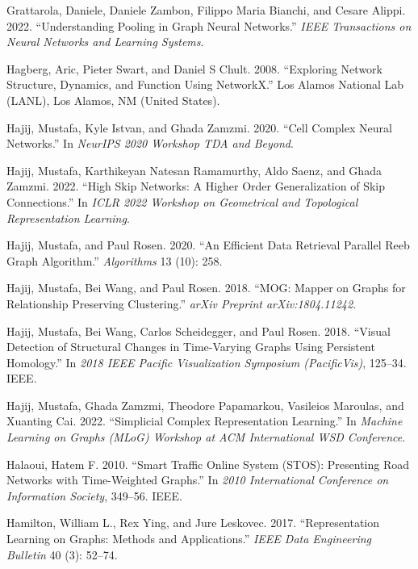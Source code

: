 \documentclass[
  12pt,
]{krantz}
\newlength{\cslhangindent}
\newenvironment{CSLReferences}[2] %
 {\begin{list}{}{%
  \setlength{\itemindent}{0pt}
  \setlength{\leftmargin}{0pt}
  \setlength{\parsep}{0pt}
  \ifodd #1
   \setlength{\leftmargin}{\cslhangindent}
   \setlength{\itemindent}{-1\cslhangindent}
  \fi
  \setlength{\itemsep}{#2\baselineskip}}}
 {\end{list}}
\begin{document}
\begin{CSLReferences}{1}{0}
Grattarola, Daniele, Daniele Zambon, Filippo Maria Bianchi, and Cesare
Alippi. 2022. {``Understanding Pooling in Graph Neural Networks.''}
\emph{IEEE Transactions on Neural Networks and Learning Systems}.

Hagberg, Aric, Pieter Swart, and Daniel S Chult. 2008. {``Exploring
Network Structure, Dynamics, and Function Using {N}etwork{X}.''} Los
Alamos National Lab (LANL), Los Alamos, NM (United States).

Hajij, Mustafa, Kyle Istvan, and Ghada Zamzmi. 2020. {``Cell Complex
Neural Networks.''} In \emph{NeurIPS 2020 Workshop TDA and Beyond}.

Hajij, Mustafa, Karthikeyan Natesan Ramamurthy, Aldo Saenz, and Ghada
Zamzmi. 2022. {``High Skip Networks: A Higher Order Generalization of
Skip Connections.''} In \emph{ICLR 2022 Workshop on Geometrical and
Topological Representation Learning}.

Hajij, Mustafa, and Paul Rosen. 2020. {``An Efficient Data Retrieval
Parallel {R}eeb Graph Algorithm.''} \emph{Algorithms} 13 (10): 258.

Hajij, Mustafa, Bei Wang, and Paul Rosen. 2018. {``{MOG}: Mapper on
Graphs for Relationship Preserving Clustering.''} \emph{arXiv Preprint
arXiv:1804.11242}.

Hajij, Mustafa, Bei Wang, Carlos Scheidegger, and Paul Rosen. 2018.
{``Visual Detection of Structural Changes in Time-Varying Graphs Using
Persistent Homology.''} In \emph{2018 IEEE Pacific Visualization
Symposium (PacificVis)}, 125--34. IEEE.

Hajij, Mustafa, Ghada Zamzmi, Theodore Papamarkou, Vasileios Maroulas,
and Xuanting Cai. 2022. {``Simplicial Complex Representation
Learning.''} In \emph{Machine Learning on Graphs (MLoG) Workshop at ACM
International WSD Conference}.

Halaoui, Hatem F. 2010. {``Smart Traffic Online System ({STOS}):
Presenting Road Networks with Time-Weighted Graphs.''} In \emph{2010
International Conference on Information Society}, 349--56. IEEE.

Hamilton, William L., Rex Ying, and Jure Leskovec. 2017.
{``Representation Learning on Graphs: Methods and Applications.''}
\emph{IEEE Data Engineering Bulletin} 40 (3): 52--74.


\end{CSLReferences}
\end{document}
